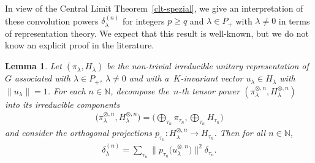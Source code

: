 \documentclass[11pt]{article}
\numberwithin{equation}{section}
\newtheorem{Lemma}[Theorem]{Lemma}
\begin{document}
In view of the Central Limit Theorem~\ref{clt-spezial}, we give an interpretation of these convolution powers
$\delta_\lambda^{(n)}$ for integers $p\ge q$ and $\lambda\in P_+$ with $\lambda\ne 0$ in terms of representation theory.
We expect that this result is well-known, but we do not know an explicit proof in the literature.

\begin{Lemma}
\label{potenzen-tensoren}
Let $(\pi_\lambda,H_\lambda)$ be the non-trivial irreducible unitary representation of~$G$ associated with $\lambda\in
P_+$, $\lambda\ne0$ and with a~$K$-invariant vector $u_\lambda\in H_\lambda$ with $\|u_\lambda\|=1$.
For each $n\in \mathbb N$, decompose the~$n$-th tensor power $(\pi_\lambda^{\otimes, n},H_\lambda^{\otimes, n})$ into
its irreducible components
\begin{gather}
\label{tensor-zerl}
\big(\pi_\lambda^{\otimes, n},H_\lambda^{\otimes, n}\big)=\bigg(\bigoplus_{\tau_n}\pi_{\tau_n}, \bigoplus_{\tau_n} H_{\tau_n}\bigg)
\end{gather}
and consider the orthogonal projections $p_{\tau_n}:H_\lambda^{\otimes, n}\to H_{\tau_n}$.
Then for all $n\in\mathbb N$,
\begin{gather*}
\delta_\lambda^{(n)}= \sum\limits_{\tau_n}\big\|p_{\tau_n}\big(u_\lambda^{\otimes, n}\big)\big\|^2 \delta_{\tau_n}.
\end{gather*}
\end{Lemma}
\end{document}
